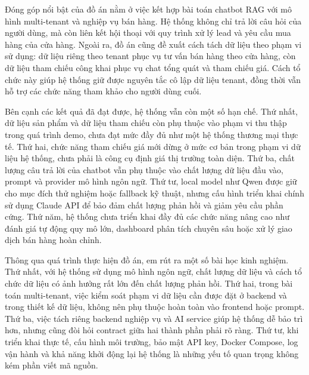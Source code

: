 \documentclass[../DoAn.tex]{subfiles}
\begin{document}
Đóng góp nổi bật của đồ án nằm ở việc kết hợp bài toán chatbot RAG với mô hình multi-tenant và nghiệp vụ bán hàng. Hệ thống không chỉ trả lời câu hỏi của người dùng, mà còn liên kết hội thoại với quy trình xử lý lead và yêu cầu mua hàng của cửa hàng. Ngoài ra, đồ án cũng đề xuất cách tách dữ liệu theo phạm vi sử dụng: dữ liệu riêng theo tenant phục vụ tư vấn bán hàng theo cửa hàng, còn dữ liệu tham chiếu công khai phục vụ chat tổng quát và tham chiếu giá. Cách tổ chức này giúp hệ thống giữ được nguyên tắc cô lập dữ liệu tenant, đồng thời vẫn hỗ trợ các chức năng tham khảo cho người dùng cuối.

Bên cạnh các kết quả đã đạt được, hệ thống vẫn còn một số hạn chế. Thứ nhất, dữ liệu sản phẩm và dữ liệu tham chiếu còn phụ thuộc vào phạm vi thu thập trong quá trình demo, chưa đạt mức đầy đủ như một hệ thống thương mại thực tế. Thứ hai, chức năng tham chiếu giá mới dừng ở mức cơ bản trong phạm vi dữ liệu hệ thống, chưa phải là công cụ định giá thị trường toàn diện. Thứ ba, chất lượng câu trả lời của chatbot vẫn phụ thuộc vào chất lượng dữ liệu đầu vào, prompt và provider mô hình ngôn ngữ. Thứ tư, local model như Qwen được giữ cho mục đích thử nghiệm hoặc fallback kỹ thuật, nhưng cấu hình triển khai chính sử dụng Claude API để bảo đảm chất lượng phản hồi và giảm yêu cầu phần cứng. Thứ năm, hệ thống chưa triển khai đầy đủ các chức năng nâng cao như đánh giá tự động quy mô lớn, dashboard phân tích chuyên sâu hoặc xử lý giao dịch bán hàng hoàn chỉnh.


Thông qua quá trình thực hiện đồ án, em rút ra một số bài học kinh nghiệm. Thứ nhất, với hệ thống sử dụng mô hình ngôn ngữ, chất lượng dữ liệu và cách tổ chức dữ liệu có ảnh hưởng rất lớn đến chất lượng phản hồi. Thứ hai, trong bài toán multi-tenant, việc kiểm soát phạm vi dữ liệu cần được đặt ở backend và trong thiết kế dữ liệu, không nên phụ thuộc hoàn toàn vào frontend hoặc prompt. Thứ ba, việc tách riêng backend nghiệp vụ và AI service giúp hệ thống dễ bảo trì hơn, nhưng cũng đòi hỏi contract giữa hai thành phần phải rõ ràng. Thứ tư, khi triển khai thực tế, cấu hình môi trường, bảo mật API key, Docker Compose, log vận hành và khả năng khởi động lại hệ thống là những yếu tố quan trọng không kém phần viết mã nguồn.
\end{document}
